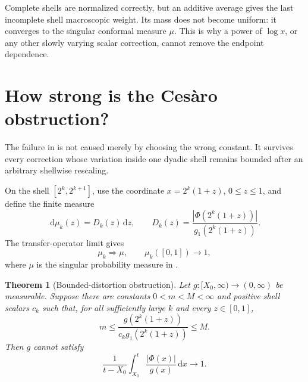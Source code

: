 \documentclass[11pt,oneside]{article}
\numberwithin{equation}{section}
\newtheorem{theorem}{Theorem}[section]
\theoremstyle{definition}
\theoremstyle{remark}
\newcommand{\dd}{\,\mathrm d}
\newcommand{\abs}[1]{\left|#1\right|}
\newcommand{\PhiUp}{\Phi}
\begin{document}
\begin{meaningbox}
Complete shells are normalized correctly, but an additive average gives the last incomplete
shell macroscopic weight.  Its mass does not become uniform: it converges to the singular
conformal measure \(\mu\).  This is why a power of \(\log x\), or any other slowly varying
scalar correction, cannot remove the endpoint dependence.
\end{meaningbox}

\section{How strong is the Ces\`aro obstruction?}
\label{sec:obstruction}

The failure in  is not caused merely by choosing the wrong constant.
It survives every correction whose variation inside one dyadic shell remains bounded after
an arbitrary shellwise rescaling.

On the shell \([2^k,2^{k+1}]\), use the coordinate \(x=2^k(1+z)\), \(0\le z\le1\), and
define the finite measure
\begin{equation}
 \dd\mu_k(z)=D_k(z)\dd z,
 \qquad
 D_k(z)=\frac{\abs{\PhiUp(2^k(1+z))}}{g_1(2^k(1+z))}.
 \label{eq:mu-k}
\end{equation}
The transfer-operator limit gives
\begin{equation}
 \mu_k\Longrightarrow\mu,
 \qquad \mu_k([0,1])\longrightarrow1,
 \label{eq:mu-k-limit}
\end{equation}
where \(\mu\) is the singular probability measure in .

\begin{theorem}[Bounded-distortion obstruction]
\label{thm:bounded-distortion}
Let \(g:[X_0,\infty)\to(0,\infty)\) be measurable.  Suppose there are constants
\(0<m<M<\infty\) and positive shell scalars \(c_k\) such that, for all sufficiently large
\(k\) and every \(z\in[0,1]\),
\begin{equation}
 m\le\frac{g(2^k(1+z))}{c_kg_1(2^k(1+z))}\le M.
 \label{eq:bounded-distortion}
\end{equation}
Then \(g\) cannot satisfy
\begin{equation}
 \frac1{t-X_0}\int_{X_0}^{t}\frac{\abs{\PhiUp(x)}}{g(x)}\dd x\longrightarrow1.
 \label{eq:unrestricted-target}
\end{equation}
\end{theorem}
\end{document}
